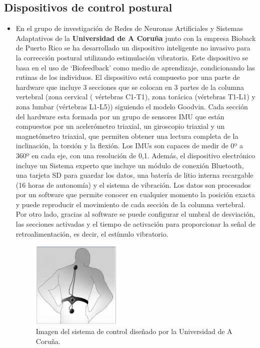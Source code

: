 \subsection{Dispositivos de control postural} 
\begin{itemize}
    \item En el grupo de investigación de Redes de Neuronas Artificiales y Sistemas Adaptativos de la \textbf{Universidad de A Coruña} junto con la empresa Bioback de Puerto Rico se ha desarrollado un dispositivo inteligente no invasivo para la corrección postural utilizando estimulación vibratoria\cite{dispUAC}. Este dispositivo se basa en el uso de ‘Biofeedback’ como medio de aprendizaje, condicionando las rutinas de los individuos.  \newline El dispositivo está compuesto por una parte de hardware que incluye 3 secciones que se colocan en 3 partes de la columna vertebral (zona cervical ( vértebras C1-T1), zona torácica (vértebras T1-L1) y zona lumbar (vértebras L1-L5)) siguiendo el modelo Goodvin. Cada sección del hardware esta formada por un grupo de sensores IMU que están compuestos por un acelerómetro triaxial, un giroscopio triaxial y un magnetómetro triaxial, que permiten obtener una lectura completa de la inclinación, la torsión y la flexión. Los IMUs son capaces de medir de 0º a 360º en cada eje, con una resolución de 0,1. Además, el dispositivo electrónico incluye un Sistema experto que incluye un módulo de conexión Bluetooth, una tarjeta SD para guardar los datos, una batería de litio interna recargable (16 horas de autonomía) y el sistema de vibración.  \newline Los datos son procesados por un software que permite conocer en cualquier momento la posición exacta y puede reproducir el movimiento de cada sección de la columna vertebral. Por otro lado, gracias al software se puede configurar el umbral de desviación, las secciones activadas y el tiempo de activación para proporcionar la señal de retroalimentación, es decir, el estímulo vibratorio. 

\begin{figure}[h!]
    \centering
    \includegraphics[width=0.4\textwidth]{img/imgUAC.png}
    \caption{Imagen del sistema de control diseñado por la Universidad de A Coruña.\cite{dispUAC}}
    \label{fig:imgUAC} 
\end{figure}



\end{itemize}
